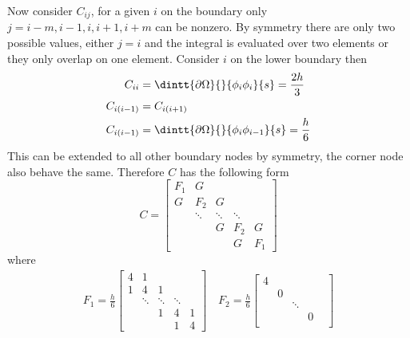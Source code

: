 \documentclass[11pt, titlepage]{article}
\begin{document}
\begin{enumerate}
\begin{enumerate}
        Now consider $C_{ij}$, for a given $i$ on the boundary only
        $j = i-m, i-1, i, i+1, i+m$ can be nonzero.
        By symmetry there are only two possible values, either $j = i$
        and the integral is evaluated over two elements or they only overlap
        on one element.
        Consider $i$ on the lower boundary then
        \begin{align*}
          C_{ii} &= \dintt{\partial \Omega}{}{\phi_i \phi_i}{s} = \frac{2h}{3} \\
          C_{i(i-1)} &= C_{i(i+1)} \\
          C_{i(i-1)} &= \dintt{\partial \Omega}{}{\phi_i \phi_{i-1}}{s} = \frac{h}{6} \\
        \end{align*}
        This can be extended to all other boundary nodes by symmetry, the corner
        node also behave the same.
        Therefore $C$ has the following form
        \[
          C =
          \begin{bmatrix}
            F_1 & G      &        &        &     \\
            G   & F_2    & G      &        &     \\
                & \ddots & \ddots & \ddots &     \\
                &        & G      & F_2    & G   \\
                &        &        & G      & F_1
          \end{bmatrix}
        \]
        where
        \begin{align*}
          F_1 =
          \frac{h}{6}
          \begin{bmatrix}
             4 &  1     &        &        &    \\
             1 &  4     &  1     &        &    \\
               & \ddots & \ddots & \ddots &    \\
               &        &  1     &  4     &  1 \\
               &        &        &  1     &  4
          \end{bmatrix} \quad
          F_2 =
          \frac{h}{6}
          \begin{bmatrix}
            4 &   &        &   & \\
              & 0 &        &   & \\
              &   & \ddots &   & \\
              &   &        & 0 & \\

\end{bmatrix}
\end{align*}
\end{enumerate}
\end{enumerate}
\end{document}
